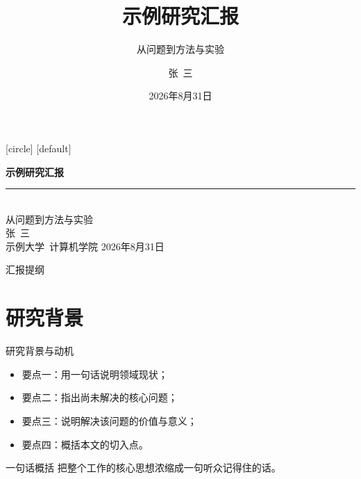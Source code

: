 [circle]
[default]

\title{示例研究汇报}
\subtitle{从问题到方法与实验}
\author{张~三}
\date{2026年8月31日}



\begin{frame}[plain]
  \begin{center}
    \vspace{2.2em}
    {\color{maincolor}\Huge\bfseries 示例研究汇报}\\[0.8em]
    {\color{maincolor}\rule{0.5\paperwidth}{1.2pt}}\\[0.8em]
    {\large 从问题到方法与实验}\\[2.5em]
    {\large 张~三}\\[0.4em]
    {\color{graytext} 示例大学~计算机学院 \quad 2026年8月31日}
  \end{center}
\end{frame}

\begin{frame}{汇报提纲}
  \tableofcontents
\end{frame}

\section{研究背景}

\begin{frame}{研究背景与动机}
  \begin{itemize}
    \item 要点一：用一句话说明领域现状；
    \item 要点二：指出尚未解决的\alert{核心问题}；
    \item 要点三：说明解决该问题的价值与意义；
    \item 要点四：概括本文的切入点。
  \end{itemize}
  \begin{block}{一句话概括}
    把整个工作的核心思想浓缩成一句听众记得住的话。
  \end{block}
\end{frame}

